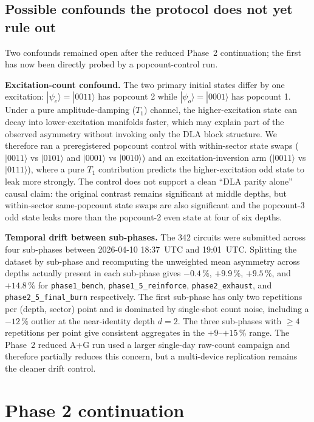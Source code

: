 \documentclass[reprint,aps,physrev,superscriptaddress,floatfix,longbibliography]{revtex4-2}
\begin{document}
\subsection{Possible confounds the protocol does not yet rule out}

Two confounds remained open after the reduced Phase~2 continuation;
the first has now been directly probed by a popcount-control run.

\textbf{Excitation-count confound.} The two primary initial states
differ by one excitation: $|\psi_e\rangle = |0011\rangle$ has
popcount 2 while $|\psi_o\rangle = |0001\rangle$ has popcount 1.
Under a pure amplitude-damping ($T_1$) channel, the higher-excitation
state can decay into lower-excitation manifolds faster, which may
explain part of the observed asymmetry without invoking only the DLA
block structure. We therefore ran a preregistered popcount control
with within-sector state swaps
($|0011\rangle$ vs $|0101\rangle$ and
$|0001\rangle$ vs $|0010\rangle$) and an excitation-inversion arm
($|0011\rangle$ vs $|0111\rangle$), where a pure $T_1$ contribution
predicts the higher-excitation odd state to leak more strongly. The
control does not support a clean ``DLA parity alone'' causal claim:
the original contrast remains significant at middle depths, but
within-sector same-popcount state swaps are also significant and the
popcount-3 odd state leaks more than the popcount-2 even state at
four of six depths.

\textbf{Temporal drift between sub-phases.} The 342 circuits were
submitted across four sub-phases between 2026-04-10 18:37~UTC and
19:01~UTC. Splitting the dataset by sub-phase and recomputing the
unweighted mean asymmetry across depths actually present in each
sub-phase gives $-0.4\,\%$, $+9.9\,\%$, $+9.5\,\%$, and $+14.8\,\%$
for \texttt{phase1\_bench}, \texttt{phase1\_5\_reinforce},
\texttt{phase2\_exhaust}, and \texttt{phase2\_5\_final\_burn}
respectively. The first sub-phase has only two repetitions per
(depth, sector) point and is dominated by single-shot count noise,
including a $-12\,\%$ outlier at the near-identity depth $d = 2$.
The three sub-phases with $\ge 4$ repetitions per point give
consistent aggregates in the $+9$--$+15\,\%$ range. The Phase~2
reduced A+G run used a larger single-day raw-count campaign and
therefore partially reduces this concern, but a multi-device
replication remains the cleaner drift control.

\section{Phase 2 continuation}
\label{sec:phase2}
\end{document}
